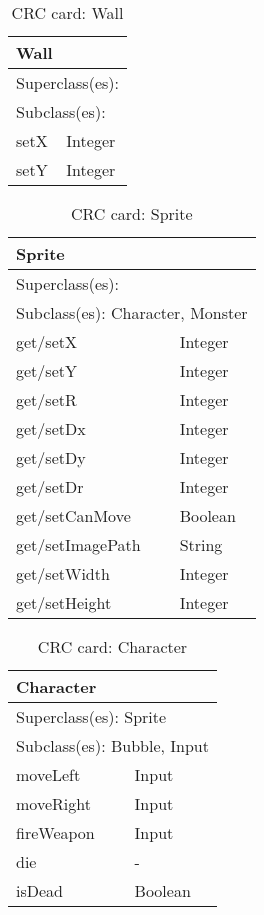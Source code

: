 \begin{table}[h!]
\centering
\label{crc_wall}
\begin{tabular}{|l|l|}
\hline
\multicolumn{2}{|l|}{\textbf{Wall}} \\ \hline
\multicolumn{2}{|l|}{Superclass(es):} \\ \hline
\multicolumn{2}{|l|}{Subclass(es):} \\ \hline
setX           & Integer \\ \hline
setY           & Integer\\ \hline
\end{tabular}
\caption{CRC card: Wall}
\end{table}

\begin{table}[h!]
\centering
\label{crc_sprite}
\begin{tabular}{|l|l|}
\hline
\multicolumn{2}{|l|}{\textbf{Sprite}} \\ \hline
\multicolumn{2}{|l|}{Superclass(es):} \\ \hline
\multicolumn{2}{|l|}{Subclass(es): Character, Monster} \\ \hline
get/setX           & Integer \\ \hline
get/setY           & Integer \\ \hline
get/setR           & Integer \\ \hline
get/setDx          & Integer \\ \hline
get/setDy          & Integer \\ \hline
get/setDr          & Integer \\ \hline
get/setCanMove     & Boolean \\ \hline
get/setImagePath   & String \\ \hline
get/setWidth       & Integer \\ \hline
get/setHeight      & Integer \\ \hline
\end{tabular}
\caption{CRC card: Sprite}
\end{table}

\begin{table}[h!]
\centering
\label{crc_character}
\begin{tabular}{|l|l|}
\hline
\multicolumn{2}{|l|}{\textbf{Character}} \\ \hline
\multicolumn{2}{|l|}{Superclass(es): Sprite} \\ \hline
\multicolumn{2}{|l|}{Subclass(es): Bubble, Input} \\ \hline
moveLeft            & Input \\ \hline
moveRight           & Input \\ \hline
fireWeapon          & Input \\ \hline
die                 & - \\ \hline
isDead              & Boolean \\ \hline
\end{tabular}
\caption{CRC card: Character}
\end{table}

